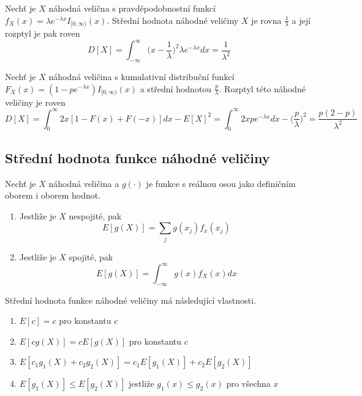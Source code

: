 \begin{example}
Nechť je $X$ náhodná velična s pravděpodobnostní funkcí $f_X(x) = \lambda e^{-\lambda x}I_{[0, \infty)}(x)$. Střední hodnota náhodné veličiny $X$ je rovna $\frac{1}{\lambda}$ a její rozptyl je pak roven
\begin{equation*}
D[X] = \int_{-\infty}^{\infty} \big(x - \frac{1}{\lambda} \big)^2 \lambda e^{-\lambda x}dx = \frac{1}{\lambda^2}
\end{equation*}
\end{example}

\begin{example}
Nechť je $X$ náhodná veličina s kumulativní distribuční funkcí $F_X(x) = (1 - p e^{-\lambda x})I_{[0, \infty)}(x)$ a střední hodnotou $\frac{p}{\lambda}$. Rozptyl této náhodné veličiny je roven
\begin{equation*}
D[X] = \int_0^{\infty} 2x [1 - F(x) + F(-x)]dx - E[X]^2 = \int_0^{\infty}2x p e^{-\lambda x}dx - \big( \frac{p}{\lambda} \big)^2 = \frac{p(2 - p)}{\lambda^2}
\end{equation*}
\end{example}

\subsection{Střední hodnota funkce náhodné veličiny}

\begin{definition}
Nechť je $X$ náhodná veličina a $g(\cdot)$ je funkce s reálnou osou jako definičním oborem i oborem hodnot.
\begin{enumerate}
\item Jestliže je $X$ nespojité, pak
\begin{equation*}
E[g(X)] = \sum_jg(x_j)f_x(x_j)
\end{equation*}
\item Jestliže je $X$ spojité, pak
\begin{equation*}
E[g(X)] = \int_{-\infty}^{\infty} g(x)f_X(x)dx
\end{equation*}
\end{enumerate}
\end{definition}

\begin{theorem}
Střední hodnota funkce náhodné veličiny má následující vlastnosti.
\begin{enumerate}
\item $E[c] = c$ pro konstantu $c$
\item $E[c g(X)] = cE[g(X)]$ pro konstantu $c$
\item $E[c_1 g_1(X) + c_2 g_2(X)] = c_1 E[g_1(X)] + c_2 E[g_2(X)]$
\item $E[g_1(X)] \le E[g_2(X)]$ jestliže $g_1(x) \le g_2(x)$ pro všechna $x$
\end{enumerate}
\end{theorem}

